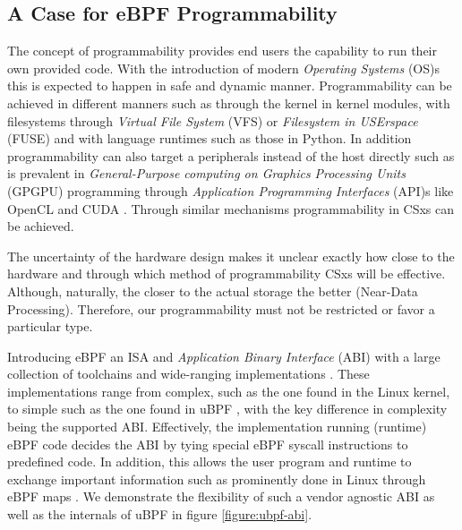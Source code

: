 \subsection{A Case for eBPF Programmability}

The concept of programmability provides end users the capability to run their
own provided code. With the introduction of modern \textit{Operating Systems}
(OS)s this is expected to happen in safe and dynamic manner. Programmability
can be achieved in different manners such as through the kernel in kernel
modules, with filesystems through \textit{Virtual File System} (VFS) \cite{vfs}
or \textit{Filesystem in USErspace} (FUSE) \cite{fuse} and with language
runtimes such as those in Python. In addition programmability can also target a
peripherals instead of the host directly such as is prevalent in
\textit{General-Purpose computing on Graphics Processing Units} (GPGPU)
programming through \textit{Application Programming Interfaces} (API)s like
OpenCL \cite{opencl} and CUDA \cite{cuda}. Through similar mechanisms
programmability in CSxs can be achieved.

The uncertainty of the hardware design makes it unclear exactly how close to the
hardware and through which method of programmability CSxs will be effective.
Although, naturally, the closer to the actual storage the better
(Near-Data Processing). Therefore, our programmability must not be restricted or
favor a particular type.

Introducing eBPF an ISA and \textit{Application Binary Interface} (ABI) with a
large collection of toolchains and wide-ranging implementations
\cite{what-ebpf, McCanne1993TheBP}. These implementations range from complex,
such as the one found in the Linux kernel, to simple such as the one found in
uBPF \cite{ubpf}, with the key difference in complexity being the supported ABI.
Effectively, the implementation running (runtime) eBPF code decides the ABI by
tying special eBPF syscall instructions to predefined code. In addition, this
allows the user program and runtime to exchange important information such as
prominently done in Linux through eBPF maps \cite{bpf-man}. We demonstrate the
flexibility of such a vendor agnostic ABI as well as the internals of uBPF in
figure \ref{figure:ubpf-abi}.


